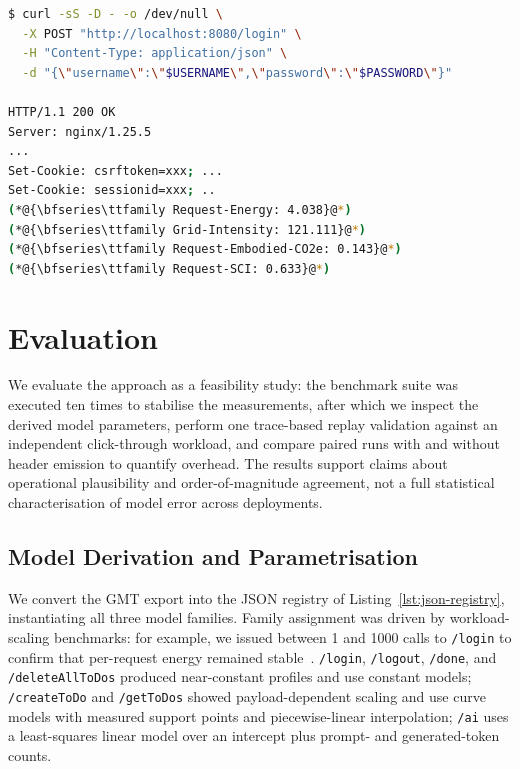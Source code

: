 \documentclass[sigconf]{acmart}
\begin{document}
\begin{lstlisting}[float,language=bash,caption={Example response headers emitted by the prototype nginx module},label={lst:curl}]
$ curl -sS -D - -o /dev/null \
  -X POST "http://localhost:8080/login" \
  -H "Content-Type: application/json" \
  -d "{\"username\":\"$USERNAME\",\"password\":\"$PASSWORD\"}"

HTTP/1.1 200 OK
Server: nginx/1.25.5
...
Set-Cookie: csrftoken=xxx; ...
Set-Cookie: sessionid=xxx; ..
(*@{\bfseries\ttfamily Request-Energy: 4.038}@*)
(*@{\bfseries\ttfamily Grid-Intensity: 121.111}@*)
(*@{\bfseries\ttfamily Request-Embodied-CO2e: 0.143}@*)
(*@{\bfseries\ttfamily Request-SCI: 0.633}@*)
\end{lstlisting}



\section{Evaluation}
\label{sec:evaluation}

We evaluate the approach as a feasibility study: the benchmark suite was executed ten times to stabilise the measurements, after which we inspect the derived model parameters, perform one trace-based replay validation against an independent click-through workload, and compare paired runs with and without header emission to quantify overhead. The results support claims about operational plausibility and order-of-magnitude agreement, not a full statistical characterisation of model error across deployments.


\subsection{Model Derivation and Parametrisation}

We convert the GMT export into the JSON registry of Listing~\ref{lst:json-registry}, instantiating all three model families. Family assignment was driven by workload-scaling benchmarks: for example, we issued between 1 and 1000 calls to \texttt{/login} to confirm that per-request energy remained stable~\cite{gmt-run-login-scaling}. \texttt{/login}, \texttt{/logout}, \texttt{/done}, and \texttt{/deleteAllToDos} produced near-constant profiles and use constant models;\\ \texttt{/createToDo} and \texttt{/getToDos} showed payload-dependent scaling and use curve models with measured support points and piecewise-linear interpolation; \texttt{/ai} uses a least-squares linear model over an intercept plus prompt- and generated-token counts.
\end{document}
